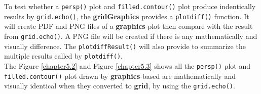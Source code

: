 \documentclass[11pt,twoside]{report}
\begin{document}
\newpage
To test whether a \texttt{persp()} plot and \texttt{filled.contour()} plot produce indentically results by \texttt{grid.echo()}, the \textbf{gridGraphics} provides a \texttt{plotdiff()} function. It will create PDF and PNG files of a \textbf{graphics}-plot then compare with the result from \texttt{grid.echo()}. A PNG file will be created if there is any mathematically and visually difference. The \texttt{plotdiffResult()} will also provide to summarize the multiple results called by \texttt{plotdiff()}.\\

The Figure \ref{chapter5.2} and Figure \ref{chapter5.3} shows all the \texttt{persp()} plot and \texttt{filled.contour()} plot drawn by \textbf{graphics}-based are mathematically and visually identical when they converted to \textbf{grid}, by using the \texttt{grid.echo()}.\\
\end{document}
